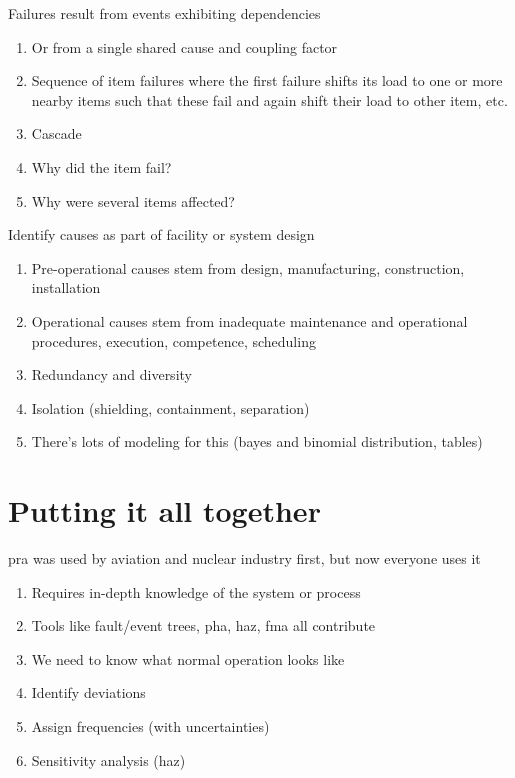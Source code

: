 \documentclass[aspectratio=1610,pdftex,dvipsnames,compress,xcolor={dvipsnames}]{beamer}
\newcommand{\acs}{\acrshort} %
\begin{document}
\begin{frame}{Failures result from events exhibiting dependencies}
    \begin{enumerate}[series=outerlist,topsep=0pt,itemsep=21pt,leftmargin=*,label=(\arabic*)]
        \item[]Or from a single shared cause and coupling factor
        \item[]Sequence of item failures where the first failure shifts its load to one or more nearby items
such that these fail and again shift their load to other item, etc.
        \item[]Cascade
        \item[]Why did the item fail?  
        \item[]Why were several items affected?
    \end{enumerate}
\end{frame}


\begin{frame}{Identify causes as part of facility or system design}
    \begin{enumerate}[series=outerlist,topsep=0pt,itemsep=21pt,leftmargin=*,label=(\arabic*)]
        \item[]Pre-operational causes stem from design, manufacturing, construction, installation
        \item[]Operational causes stem from inadequate maintenance and operational procedures, execution, competence, scheduling
        \item[]Redundancy and diversity  
        \item[]Isolation (shielding, containment, separation)
        \item[]There's lots of modeling for this (bayes and binomial distribution, tables)
    \end{enumerate}
\end{frame}


\section{Putting it all together}


\addtocounter{framenumber}{-1}
\begin{frame}{\acs{pra} was used by aviation and nuclear industry first, but now everyone uses it}
    \begin{enumerate}[series=outerlist,topsep=0pt,itemsep=15pt,leftmargin=*,label=(\arabic*)]
        \item[]Requires in-depth knowledge of the system or process  
        \item[]Tools like fault/event trees, \acs{pha}, \acs{haz}, \acs{fma} all contribute
        \item[]We need to know what normal operation looks like
        \item[]Identify deviations
        \item[]Assign frequencies (with uncertainties)
        \item[]Sensitivity analysis (\acs{haz})
    \end{enumerate}
\end{frame}
\end{document}
